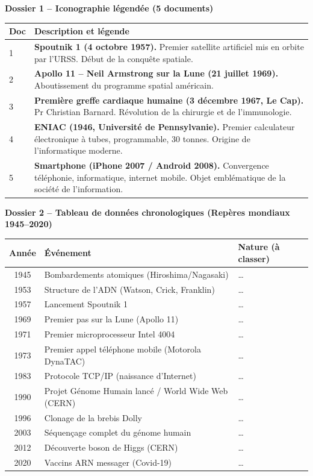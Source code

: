 \documentclass[11pt]{article}
\begin{document}
\medskip
\noindent \textbf{Dossier 1 -- Iconographie légendée (5 documents)}
\begin{center}
\begin{tabularx}{\linewidth}{|l|X|}\hline
\textbf{Doc} & \textbf{Description et légende} \\ \hline
1 & \textbf{Spoutnik 1 (4 octobre 1957).} Premier satellite artificiel mis en orbite par l'URSS. Début de la conquête spatiale. \\ \hline
2 & \textbf{Apollo 11 -- Neil Armstrong sur la Lune (21 juillet 1969).} Aboutissement du programme spatial américain. \\ \hline
3 & \textbf{Première greffe cardiaque humaine (3 décembre 1967, Le Cap).} Pr Christian Barnard. Révolution de la chirurgie et de l'immunologie. \\ \hline
4 & \textbf{ENIAC (1946, Université de Pennsylvanie).} Premier calculateur électronique à tubes, programmable, 30 tonnes. Origine de l'informatique moderne. \\ \hline
5 & \textbf{Smartphone (iPhone 2007 / Android 2008).} Convergence téléphonie, informatique, internet mobile. Objet emblématique de la société de l'information. \\ \hline
\end{tabularx}
\end{center}

\medskip
\noindent \textbf{Dossier 2 -- Tableau de données chronologiques (Repères mondiaux 1945--2020)}
\begin{center}
\begin{tabularx}{\linewidth}{|c|l|X|}\hline
\textbf{Année} & \textbf{Événement} & \textbf{Nature (à classer)} \\ \hline
1945 & Bombardements atomiques (Hiroshima/Nagasaki) & \ldots \\ \hline
1953 & Structure de l'ADN (Watson, Crick, Franklin) & \ldots \\ \hline
1957 & Lancement Spoutnik 1 & \ldots \\ \hline
1969 & Premier pas sur la Lune (Apollo 11) & \ldots \\ \hline
1971 & Premier microprocesseur Intel 4004 & \ldots \\ \hline
1973 & Premier appel téléphone mobile (Motorola DynaTAC) & \ldots \\ \hline
1983 & Protocole TCP/IP (naissance d'Internet) & \ldots \\ \hline
1990 & Projet Génome Humain lancé / World Wide Web (CERN) & \ldots \\ \hline
1996 & Clonage de la brebis Dolly & \ldots \\ \hline
2003 & Séquençage complet du génome humain & \ldots \\ \hline
2012 & Découverte boson de Higgs (CERN) & \ldots \\ \hline
2020 & Vaccins ARN messager (Covid-19) & \ldots \\ \hline
\end{tabularx}
\end{center}
\end{document}
